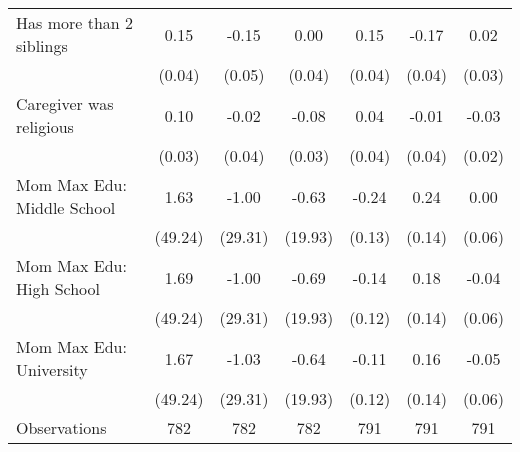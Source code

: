 {\begin{tabular}{l*{6}{c}}
\addlinespace
Has more than 2 siblings&        0.15\sym{***}&       -0.15\sym{**} &        0.00         &        0.15\sym{***}&       -0.17\sym{***}&        0.02         \\
                    &      (0.04)         &      (0.05)         &      (0.04)         &      (0.04)         &      (0.04)         &      (0.03)         \\
\addlinespace
Caregiver was religious&        0.10\sym{**} &       -0.02         &       -0.08\sym{*}  &        0.04         &       -0.01         &       -0.03         \\
                    &      (0.03)         &      (0.04)         &      (0.03)         &      (0.04)         &      (0.04)         &      (0.02)         \\
\addlinespace
Mom Max Edu: Middle School&        1.63         &       -1.00         &       -0.63         &       -0.24         &        0.24         &        0.00         \\
                    &     (49.24)         &     (29.31)         &     (19.93)         &      (0.13)         &      (0.14)         &      (0.06)         \\
\addlinespace
Mom Max Edu: High School&        1.69         &       -1.00         &       -0.69         &       -0.14         &        0.18         &       -0.04         \\
                    &     (49.24)         &     (29.31)         &     (19.93)         &      (0.12)         &      (0.14)         &      (0.06)         \\
\addlinespace
Mom Max Edu: University&        1.67         &       -1.03         &       -0.64         &       -0.11         &        0.16         &       -0.05         \\
                    &     (49.24)         &     (29.31)         &     (19.93)         &      (0.12)         &      (0.14)         &      (0.06)         \\
\midrule
Observations        &         782         &         782         &         782         &         791         &         791         &         791         \\
\bottomrule
\end{tabular}
}
